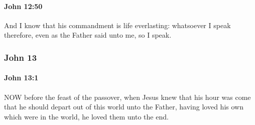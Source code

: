 		\paragraph{John 12:50} %
			\label{JOHN-12-50}

			And I know that his commandment is life everlasting: whatsoever I speak therefore, even as the Father said unto me, so I speak.

			\begin{framed}
				\scriptsize
				\begin{compactdesc}
					\item[SBLG] 
				\end{compactdesc}
			\end{framed}

	\subsubsection{John 13} %
		\label{JOHN-13}
		
		\paragraph{John 13:1} %
			\label{JOHN-13-1}

			NOW before the feast of the passover, when Jesus knew that his hour was come that he should depart out of this world unto the Father, having loved his own which were in the world, he loved them unto the end.

